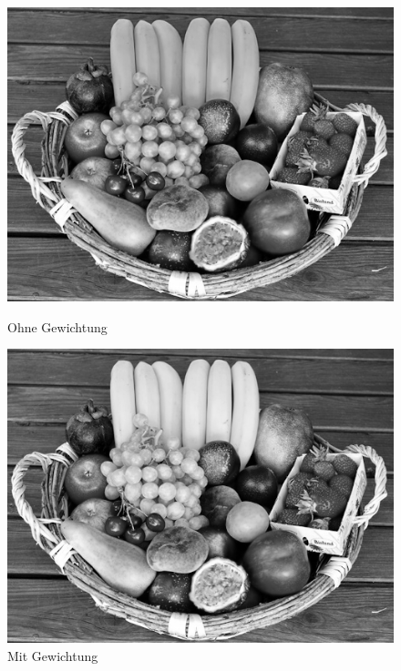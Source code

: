 \documentclass[course=erap]{aspdoc}
\begin{document}
	\begin{figure}[h]
		\begin{minipage}{0.49\linewidth}
			\centering
			\includegraphics[scale=0.3]{Images/fruit_basket_grey_standard.png}
			\caption{Ohne Gewichtung}
		\end{minipage}
		\centering
		\begin{minipage}{0.49\linewidth}
			\centering
			\includegraphics[scale=0.3]{Images/fruit_basket_grey_improved.png}
			\caption{Mit Gewichtung}
		\end{minipage}
	\end{figure}
\end{document}
